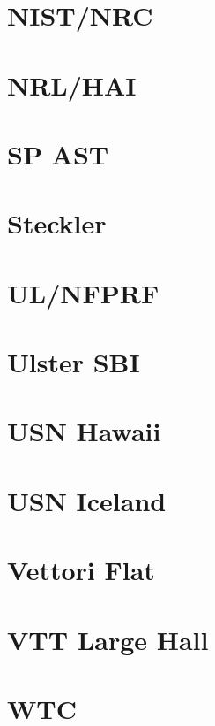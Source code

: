 \section{NIST/NRC}

\section{NRL/HAI}

\section{SP AST}

\section{Steckler}

\section{UL/NFPRF}

\section{Ulster SBI}

\section{USN Hawaii}

\section{USN Iceland}

\section{Vettori Flat}

\section{VTT Large Hall}

\section{WTC}

